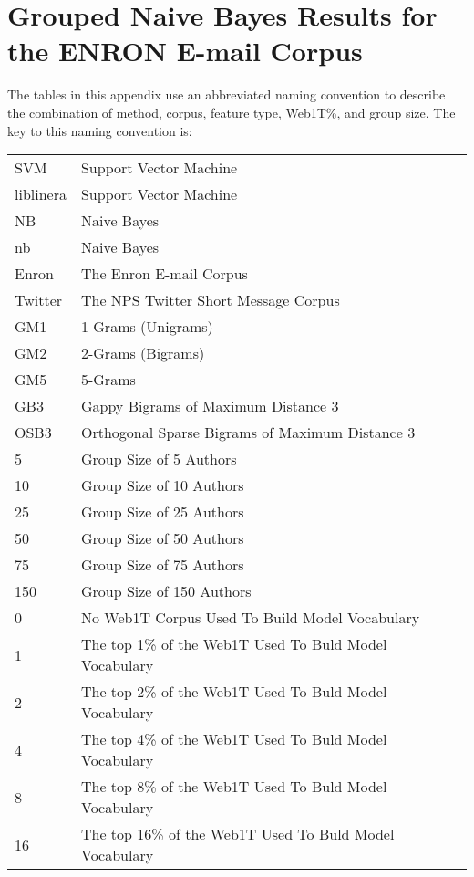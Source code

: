 \chapter{Grouped Naive Bayes Results for the ENRON E-mail Corpus}


The tables in this appendix use an abbreviated naming convention to describe the combination of method, corpus, feature type, Web1T\%, and group size.  The key to this naming convention is:

\begin{center}
\begin{table}[htbp!]
	\begin{center}
	\begin{tabular}{ll}
	SVM & Support Vector Machine\\
	liblinera & Support Vector Machine\\
	NB & Naive Bayes\\
	nb & Naive Bayes\\
	
	Enron & The Enron E-mail Corpus\\
	Twitter & The NPS Twitter Short Message Corpus\\
	
	GM1 & 1-Grams (Unigrams)\\
	GM2 & 2-Grams (Bigrams)\\
	GM5 & 5-Grams\\
	GB3 & Gappy Bigrams of Maximum Distance 3\\
	OSB3 & Orthogonal Sparse Bigrams of Maximum Distance 3\\
		
	5 & Group Size of 5 Authors\\
	10 & Group Size of 10 Authors\\
	25 & Group Size of 25 Authors\\
	50 & Group Size of 50 Authors\\
	75 & Group Size of 75 Authors\\
	150 & Group Size of 150 Authors\\
	
	0 & No Web1T Corpus Used To Build Model Vocabulary\\
	1 & The top 1\% of the Web1T Used To Buld Model Vocabulary\\
	2 & The top 2\% of the Web1T Used To Buld Model Vocabulary\\
	4 & The top 4\% of the Web1T Used To Buld Model Vocabulary\\
	8 & The top 8\% of the Web1T Used To Buld Model Vocabulary\\
	16 & The top 16\% of the Web1T Used To Buld Model Vocabulary\\
	\end{tabular}
	\end{center}
\end{table}
\end{center}



